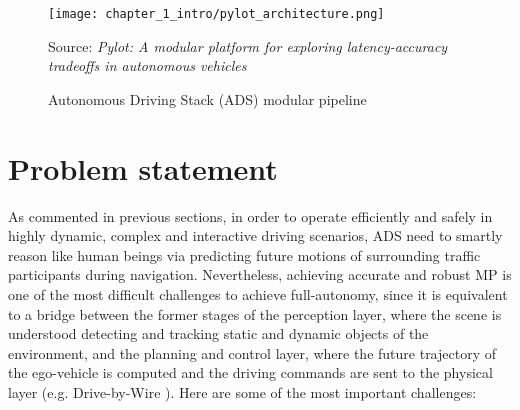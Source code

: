 \begin{figure}[h]
	\centering
	\texttt{[image: chapter\_1\_intro/pylot\_architecture.png]}
	\caption{Autonomous Driving Stack (ADS) modular pipeline}
	Source: \textit{Pylot: A modular platform for exploring latency-accuracy tradeoffs in autonomous vehicles} \cite{gog2021pylot}
	\label{fig:chapter_1_intro/pylot_architecture}
\end{figure}

\section{Problem statement}
\label{sec:1_problem_statement}

As commented in previous sections, in order to operate efficiently and safely in highly dynamic, complex and interactive driving scenarios, \acs{ADS} need to smartly reason like human beings via predicting future motions of surrounding traffic participants during navigation. Nevertheless, achieving accurate and robust \ac{MP} is one of the most difficult challenges to achieve full-autonomy, since it is equivalent to a bridge between the former stages of the perception layer, where the scene is understood detecting and tracking static and dynamic objects of the environment, and the planning and control layer, where the future trajectory of the ego-vehicle is computed and the driving commands are sent to the physical layer (e.g. Drive-by-Wire \cite{arango2020drive}). Here are some of the most important challenges: 

